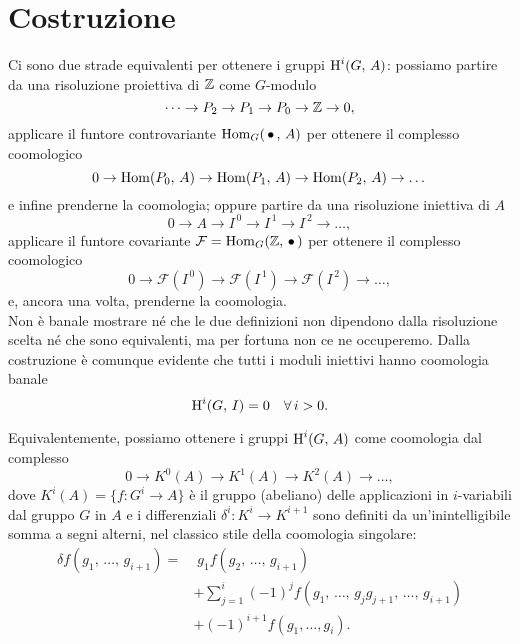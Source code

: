 \section{Costruzione}
Ci sono due strade equivalenti per ottenere i gruppi $ \operatorname{H}^i(G, \, A) $: possiamo partire da una risoluzione proiettiva di $ \mathbb{Z} $ come $ G $-modulo
\[ \dots \to P_2 \to P_1 \to P_0 \to \mathbb{Z} \to 0, \]
applicare il funtore controvariante $ \operatorname{Hom}_G(\, \bullet\,, \, A) $ per ottenere il complesso coomologico
\[ 0 \to \operatorname{Hom}(P_0, \, A) \to \operatorname{Hom}(P_1, \, A) \to \operatorname{Hom}(P_2, \, A) \to \dots \]
e infine prenderne la coomologia; oppure partire da una risoluzione iniettiva di $ A $
\[ 0 \to A \to I^{\,0} \to I^{\,1} \to I^{\,2} \to \dots, \]
applicare il funtore covariante $ \mathcal{F} = \operatorname{Hom}_G(\mathbb{Z}, \, \bullet \, ) $ per ottenere il complesso coomologico
\[ 0 \to \mathcal{F}\left(I^{\,0}\right) \to \mathcal{F}\left(I^{\,1}\right) \to \mathcal{F}\left(I^{\,2}\right) \to \dots, \]
e, ancora una volta, prenderne la coomologia. \\

Non è banale mostrare né che le due definizioni non dipendono dalla risoluzione scelta né che sono equivalenti, ma per fortuna non ce ne occuperemo. Dalla costruzione è comunque evidente che tutti i moduli iniettivi hanno coomologia banale
\begin{equation}\label{injban}
	\operatorname{H}^i(G, \, I) = 0 \quad \forall \, i > 0.
\end{equation}

Equivalentemente, possiamo ottenere i gruppi $ \operatorname{H}^i(G, \, A) $ come coomologia dal complesso
\[ 0 \to K^0(A) \to K^1(A) \to K^2 (A) \to \dots, \]
dove $ K^i(A) = \{ f \colon G^i \to A\} $ è il gruppo (abeliano) delle applicazioni in $ i $-variabili dal gruppo $ G $ in $ A $ e i differenziali $ \delta^i \colon K^i \to K^{i+1} $ sono definiti da un'inintelligibile somma a segni alterni, nel classico stile della coomologia singolare:
\begin{align*}
	\delta f(g_1, \, \dots, \, g_{i+1}) = & \;  g_1 f(g_2, \, \dots, \, g_{i+1}) \\ & + \sum_{j = 1}^{i} (-1)^j f(g_1, \, \dots, \, g_jg_{j+1}, \, \dots, \, g_{i+1}) \\ & + (-1)^{i+1} f(g_1, \dots, g_i).
\end{align*}

